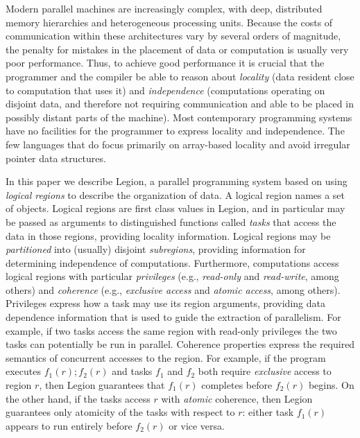 \documentclass[conference]{IEEEtran}
\begin{document}
Modern parallel machines are increasingly complex, with deep,
distributed memory hierarchies and heterogeneous processing units.  Because the
costs of communication within these architectures vary by several orders of magnitude, 
the penalty for mistakes in the placement of data or computation is usually very poor performance.  Thus,
to achieve good performance it is crucial that the programmer
and the compiler be able to reason about {\em locality} (data resident
close to computation that uses it) and {\em independence} (computations
operating on disjoint data, and therefore not requiring communication and able to be placed in possibly distant parts of the machine).  
Most contemporary
programming systems have no facilities for the programmer to express locality
and independence.  The few languages that do focus primarily on
array-based locality \cite{Fatahalian06,CHAPEL04,UPC99} and 
avoid irregular pointer data structures.

In this paper we describe Legion, a parallel programming system based
on using {\em logical regions} to describe the organization of data.
A logical region names a set of objects.  Logical regions are first
class values in Legion, and in particular may be passed as arguments
to distinguished functions called {\em tasks} that access the data in
those regions, providing locality information.  Logical regions may be
{\em partitioned} into (usually) disjoint {\em subregions}, providing
information for determining independence of computations.
Furthermore, computations access logical regions with particular {\em
  privileges} (e.g., {\em read-only} and {\em read-write}, among
others) and {\em coherence} (e.g., {\em exclusive access} and {\em
  atomic access}, among others).  Privileges express how a task may use
its region arguments, providing data dependence information that
is used to guide the extraction of parallelism.  For example, if two tasks
access the same region with read-only privileges the two tasks
can potentially be run in parallel.
Coherence properties express the required semantics of concurrent
accesses to the region.  For example, if the program executes $f_1(r); f_2(r)$ and tasks $f_1$
and $f_2$ both require {\em exclusive} access to region $r$, then Legion guarantees that 
$f_1(r)$ completes before $f_2(r)$ begins.   On the other hand, if
the tasks access $r$ with {\em atomic} coherence, then Legion
guarantees only atomicity of the tasks with respect to $r$: either task $f_1(r)$
appears to run entirely before $f_2(r)$ or vice versa.
\end{document}
